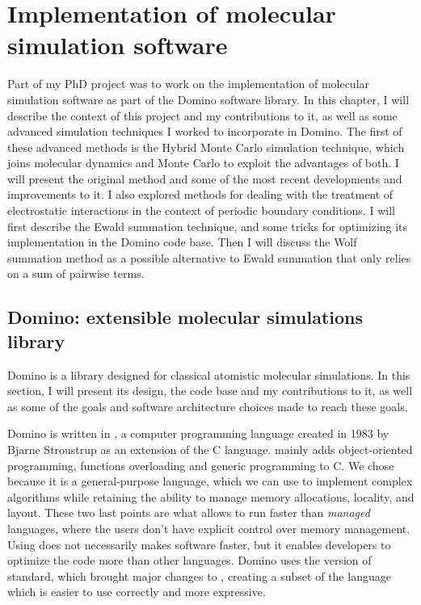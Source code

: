 \documentclass[thesis]{subfiles}
\begin{document}
\OnlyInSubfile{\setcounter{chapter}{5}}

\chapter{Implementation of molecular simulation software}

Part of my PhD project was to work on the implementation of molecular simulation
software as part of the Domino software library. In this chapter, I will describe
the context of this project and my contributions to it, as well as some advanced
simulation techniques I worked to incorporate in Domino. The first of these
advanced methods is the Hybrid Monte Carlo simulation technique, which joins
molecular dynamics and Monte Carlo to exploit the advantages of both. I will
present the original method and some of the most recent developments and
improvements to it. I also explored methods for dealing with the treatment of
electrostatic interactions in the context of periodic boundary conditions. I
will first describe the Ewald summation technique, and some tricks for
optimizing its implementation in the Domino code base. Then I will discuss the
Wolf summation method as a possible alternative to Ewald summation that only
relies on a sum of pairwise terms.

\newpage
\section{Domino: extensible molecular simulations library}

Domino is a \cxx library designed for classical atomistic molecular simulations.
In this section, I will present its design, the code base and my contributions to
it, as well as some of the goals and software architecture choices made to reach
these goals.

Domino is written in \cxx, a computer programming language created in 1983 by
Bjarne Stroustrup as an extension of the C language. \cxx mainly adds
object-oriented programming, functions overloading and generic programming to C.
We chose \cxx because it is a general-purpose language, which we can use to
implement complex algorithms while retaining the ability to manage memory
allocations, locality, and layout. These two last points are what allows \cxx to
run faster than \emph{managed} languages, where the users don't have explicit
control over memory management. Using \cxx does not necessarily makes software
faster, but it enables developers to optimize the code more than other languages.
Domino uses the  version of \cxx standard, which brought major changes to
\cxx, creating a subset of the language which is easier to use correctly and
more expressive.
\end{document}
